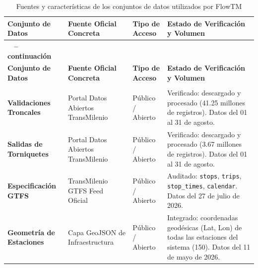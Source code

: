 \documentclass{article}
\begin{document}
\begin{longtable}{|>{\bfseries}p{} |p{} |p{} |p{}|}
    \caption{Fuentes y características de los conjuntos de datos utilizados por FlowTM}
    \label{tab:datasets-flowtm} \\

    \toprule
    \textbf{Conjunto de Datos}
    & \textbf{Fuente Oficial Concreta}
    & \textbf{Tipo de Acceso}
    & \textbf{Estado de Verificación y Volumen} \\
    \midrule
    \endfirsthead

    \multicolumn{4}{c}%
    {{\tablename\ \thetable{} -- continuación}} \\
    \toprule
    \textbf{Conjunto de Datos}
    & \textbf{Fuente Oficial Concreta}
    & \textbf{Tipo de Acceso}
    & \textbf{Estado de Verificación y Volumen} \\
    \midrule
    \endhead

    \midrule
    \multicolumn{4}{r}{{Continúa en la siguiente página}} \\
    \endfoot

    \bottomrule
    \endlastfoot

    \textbf{Validaciones Troncales}
    &
    Portal Datos Abiertos TransMilenio~\cite{transmilenio2026datos}
    &
    Público / Abierto
    &
    Verificado: descargado y procesado
    (41.25 millones de registros). Datos del 01 al 31 de agosto.
    \\ \hline

    \textbf{Salidas de Torniquetes}
    &
    Portal Datos Abiertos TransMilenio~\cite{transmilenio2026datos}
    &
    Público / Abierto
    &
    Verificado: descargado y procesado
    (3.67 millones de registros). Datos del 01 al 31 de agosto.
    \\ \hline

    \textbf{Especificación GTFS}
    &
    TransMilenio GTFS Feed Oficial~\cite{transmilenio2026datos}
    &
    Público / Abierto
    &
    Auditado: \texttt{stops}, \texttt{trips},
    \texttt{stop\_times}, \texttt{calendar}. Datos del 27 de julio de 2026.
    \\ \hline

    \textbf{Geometría de Estaciones}
    &
    Capa GeoJSON de Infraestructura~\cite{transmilenio2026datos}
    &
    Público / Abierto
    &
    Integrado: coordenadas geodésicas
    (Lat, Lon) de todas las estaciones del sistema (150). Datos del 11 de mayo de 2026.
    \\

\end{longtable}
\end{document}
